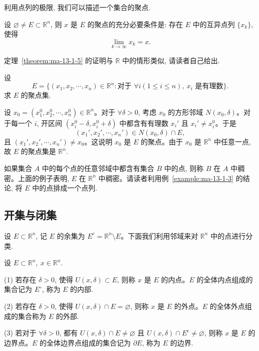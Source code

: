 利用点列的极限, 我们可以描述一个集合的聚点.

\begin{theorem}\label{theorem:ma-13-1-5}
设 $\varnothing\ne E\subset\mathbb R^n$, 则 $x$ 是 $E$ 的聚点的充分必要条件是: 存在 $E$ 中的互异点列 $\{x_k\}$, 使得
\[
  \lim_{k\to\infty}x_k=x.
\]
\end{theorem}

定理~\ref{theorem:ma-13-1-5} 的证明与 $\mathbb R$ 中的情形类似, 请读者自己给出.

\begin{example}\label{example:ma-13-1-3}
设
\[
  E=\{(x_1,x_2,\cdots,x_n)\in\mathbb R^n:\text{对于 }\forall i(1\leqslant i\leqslant n),\ x_i\text{ 是有理数}\}.
\]
求 $E$ 的聚点集.
\end{example}


\begin{solve}
设 $x_0=(x_1^0,x_2^0,\cdots,x_n^0)\in\mathbb R^n$。对于 $\forall\delta>0$, 考虑 $x_0$ 的方形邻域 $N(x_0,\delta)$。对于每一个 $i$, 开区间 $(x_i^0-\delta,x_i^0+\delta)$ 中都含有有理数 $x_i'$ 且 $x_i'\ne x_i^0$。于是
\[
  (x_1',x_2',\cdots,x_n')\in N(x_0,\delta)\cap E,
\]
且 $(x_1',x_2',\cdots,x_n')\ne x_0$。这说明 $x_0$ 是 $E$ 的聚点。由于 $x_0$ 是 $\mathbb R^n$ 中任意一点, 故 $E$ 的聚点集是 $\mathbb R^n$.

如果集合 $A$ 中的每个点的任意邻域中都含有集合 $B$ 中的点, 则称 $B$ 在 $A$ 中稠密。上面的例子表明, $E$ 在 $\mathbb R^n$ 中稠密。请读者利用例~\ref{example:ma-13-1-3} 的结论, 将 $E$ 中的点排成一个点列.
\end{solve}


\subsection{开集与闭集}
\label{subsec:ma-13-1-4}

设 $E\subset\mathbb R^n$, 记 $E$ 的余集为 $E^c=\mathbb R^n\setminus E$。下面我们利用邻域来对 $\mathbb R^n$ 中的点进行分类.

\begin{definition}\label{definition:ma-13-1-5}
设 $E\subset\mathbb R^n,\ x\in\mathbb R^n$.

(1) 若存在 $\delta>0$, 使得 $U(x,\delta)\subset E$, 则称 $x$ 是 $E$ 的内点。$E$ 的全体内点组成的集合记为 $E^\circ$, 称为 $E$ 的内部.

(2) 若存在 $\delta>0$, 使得 $U(x,\delta)\cap E=\varnothing$, 则称 $x$ 是 $E$ 的外点。$E$ 的全体外点组成的集合称为 $E$ 的外部.

(3) 若对于 $\forall\delta>0$, 都有 $U(x,\delta)\cap E\ne\varnothing$ 且 $U(x,\delta)\cap E^c\ne\varnothing$, 则称 $x$ 是 $E$ 的边界点。$E$ 的全体边界点组成的集合记为 $\partial E$, 称为 $E$ 的边界.
\end{definition}


